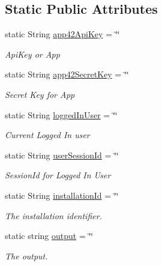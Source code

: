 \subsection*{Static Public Attributes}
\begin{DoxyCompactItemize}
\item 
static String \hyperlink{classcom_1_1shephertz_1_1app42_1_1paas_1_1sdk_1_1csharp_1_1_app42_a_p_i_a5a8d147307eb955b8d7172b90d6f43b6}{app42\+Api\+Key} = \char`\"{}\char`\"{}
\begin{DoxyCompactList}\small\item\em Api\+Key or App \end{DoxyCompactList}\item 
static String \hyperlink{classcom_1_1shephertz_1_1app42_1_1paas_1_1sdk_1_1csharp_1_1_app42_a_p_i_ac4c83ed3d99e8239095cbc5dbaf0ca39}{app42\+Secret\+Key} = \char`\"{}\char`\"{}
\begin{DoxyCompactList}\small\item\em Secret Key for App \end{DoxyCompactList}\item 
static String \hyperlink{classcom_1_1shephertz_1_1app42_1_1paas_1_1sdk_1_1csharp_1_1_app42_a_p_i_a5efb35bfcc658eb5eea3661759c2e369}{logged\+In\+User} = \char`\"{}\char`\"{}
\begin{DoxyCompactList}\small\item\em Current Logged In user \end{DoxyCompactList}\item 
static String \hyperlink{classcom_1_1shephertz_1_1app42_1_1paas_1_1sdk_1_1csharp_1_1_app42_a_p_i_aff787448095619d43e069be4e1bffed2}{user\+Session\+Id} = \char`\"{}\char`\"{}
\begin{DoxyCompactList}\small\item\em Session\+Id for Logged In User \end{DoxyCompactList}\item 
static String \hyperlink{classcom_1_1shephertz_1_1app42_1_1paas_1_1sdk_1_1csharp_1_1_app42_a_p_i_a6f0e5b52addd4183ef36df05ce7b7c9a}{installation\+Id} = \char`\"{}\char`\"{}
\begin{DoxyCompactList}\small\item\em The installation identifier. \end{DoxyCompactList}\item 
static string \hyperlink{classcom_1_1shephertz_1_1app42_1_1paas_1_1sdk_1_1csharp_1_1_app42_a_p_i_abb73abcc15770bdefa6688c94ee40fe7}{output} = \char`\"{}\char`\"{}
\begin{DoxyCompactList}\small\item\em The output. \end{DoxyCompactList}\item 

\end{DoxyCompactItemize}
